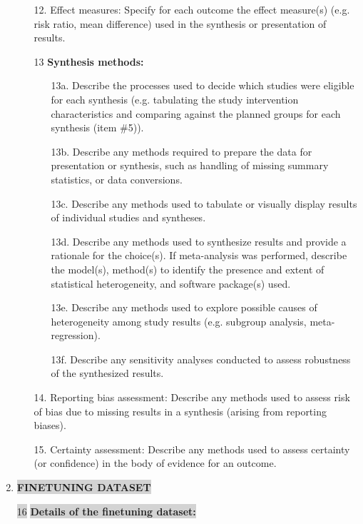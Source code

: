 \documentclass{article}
\begin{document}
\begin{enumerate}
\begin{itemize}
        \item[12.] Effect measures: Specify for each outcome the effect measure(s) (e.g. risk ratio, mean difference) used in the synthesis or presentation of results.
        \item[13] \textbf{Synthesis methods:}
        \begin{itemize}
            \item[13a.] Describe the processes used to decide which studies were eligible for each synthesis (e.g. tabulating the study intervention characteristics and comparing against the planned groups for each synthesis (item \#5)).
            \item[13b.] Describe any methods required to prepare the data for presentation or synthesis, such as handling of missing summary statistics, or data conversions.
            \item[13c.] Describe any methods used to tabulate or visually display results of individual studies and syntheses.
            \item[13d.] Describe any methods used to synthesize results and provide a rationale for the choice(s). If meta-analysis was performed, describe the model(s), method(s) to identify the presence and extent of statistical heterogeneity, and software package(s) used.
            \item[13e.] Describe any methods used to explore possible causes of heterogeneity among study results (e.g. subgroup analysis, meta-regression).
            \item[13f.] Describe any sensitivity analyses conducted to assess robustness of the synthesized results.
        \end{itemize}
        \item[14.] Reporting bias assessment: Describe any methods used to assess risk of bias due to missing results in a synthesis (arising from reporting biases).
        \item[15.] Certainty assessment: Describe any methods used to assess certainty (or confidence) in the body of evidence for an outcome.
    \end{itemize}

    \item \colorbox{lightgray}{\textbf{FINETUNING DATASET}}
    \item[\colorbox{lightgray}{16}] \colorbox{lightgray}{\textbf{Details of the finetuning dataset:}}


\end{enumerate}
\end{document}
